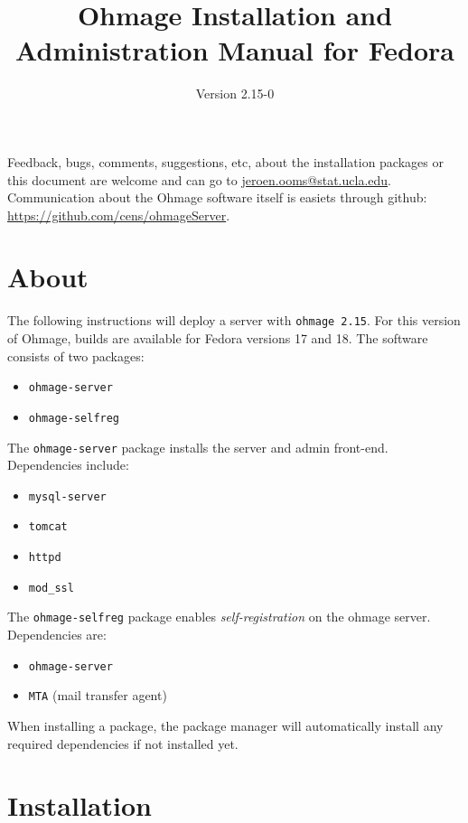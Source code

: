 \documentclass{scrartcl}
\title{Ohmage Installation and Administration Manual for Fedora}
\subtitle{Version 2.15-0}
\begin{document}
\maketitle

\noindent Feedback, bugs, comments, suggestions, etc, about the installation
packages or this document are welcome and can go to \href{mailto:jeroen.ooms@stat.ucla.edu}{jeroen.ooms@stat.ucla.edu}.
Communication about the Ohmage software itself is easiets through github:
\href{https://github.com/cens/ohmageServer}{https://github.com/cens/ohmageServer}.

\section*{About}

\noindent The following instructions will deploy a server with \texttt{ohmage
2.15}. For this version of Ohmage, builds are available for Fedora versions 17 and 18.
The software consists of two packages:

\begin{itemize}
  \item \texttt{ohmage-server}
  \item \texttt{ohmage-selfreg} 
\end{itemize}

\noindent The \texttt{ohmage-server} package installs the server and
admin front-end. Dependencies include:

\begin{itemize}
  \item \texttt{mysql-server}
  \item \texttt{tomcat}
  \item \texttt{httpd}
  \item \texttt{mod\_ssl}
\end{itemize}

\noindent The \texttt{ohmage-selfreg} package enables \emph{self-registration}
on the ohmage server. Dependencies are:

\begin{itemize}
  \item \texttt{ohmage-server}
  \item \texttt{MTA} (mail transfer agent)
\end{itemize}

\noindent When installing a package, the package manager will automatically
install any required dependencies if not installed yet.


\section{Installation}
\end{document}

